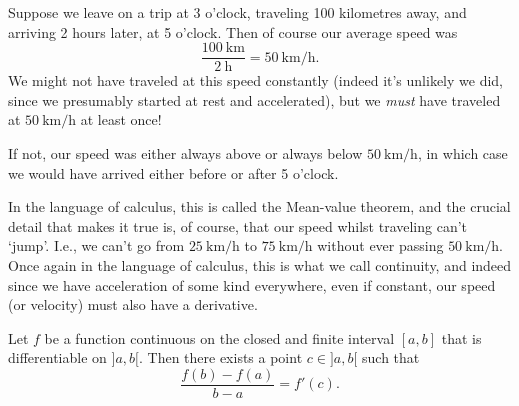 
\begin{example}
	Suppose we leave on a trip at 3 o'clock, traveling 100 kilometres away, and arriving 2 hours later, at 5 o'clock.
	Then of course our average speed was
	\[
		\frac{\SI{100}{\kilo\metre}}{\SI{2}{\hour}} = \SI[per-mode = symbol]{50}{\kilo\metre\per\hour}.
	\]
	We might not have traveled at this speed constantly (indeed it's unlikely we did, since we presumably started at rest and accelerated), but we \emph{must} have traveled at $\SI[per-mode = symbol]{50}{\kilo\metre\per\hour}$ at least once!

	If not, our speed was either always above or always below $\SI[per-mode = symbol]{50}{\kilo\metre\per\hour}$, in which case we would have arrived either before or after 5 o'clock.
\end{example}

\noindent
In the language of calculus, this is called the Mean-value theorem, and the crucial detail that makes it true is, of course, that our speed whilst traveling can't `jump'.
I.e., we can't go from $\SI[per-mode = symbol]{25}{\kilo\metre\per\hour}$ to $\SI[per-mode = symbol]{75}{\kilo\metre\per\hour}$ without ever passing $\SI[per-mode = symbol]{50}{\kilo\metre\per\hour}$.
Once again in the language of calculus, this is what we call continuity, and indeed since we have acceleration of some kind everywhere, even if constant, our speed (or velocity) must also have a derivative.

\begin{theorem}
	Let $f$ be a function continuous on the closed and finite interval $[a, b]$ that is differentiable on $]{a, b}[$.
	Then there exists a point $c \in {]{a, b}[}$ such that
	\[
		\frac{f(b) - f(a)}{b - a} = f'(c).
	\]
\end{theorem}

